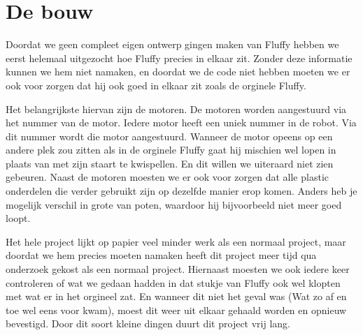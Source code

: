 \chapter{De bouw}
Doordat we geen compleet eigen ontwerp gingen maken van Fluffy hebben we eerst helemaal uitgezocht hoe Fluffy precies in elkaar zit. Zonder deze informatie kunnen we hem niet namaken, en doordat we de code niet hebben moeten we er ook voor zorgen dat hij ook goed in elkaar zit zoals de orginele Fluffy. 

Het belangrijkste hiervan zijn de motoren. De motoren worden aangestuurd via het nummer van de motor. Iedere motor heeft een uniek nummer in de robot. Via dit nummer wordt die motor aangestuurd. Wanneer de motor opeens op een andere plek zou zitten als in de orginele Fluffy gaat hij mischien wel lopen in plaats van met zijn staart te kwispellen. En dit willen we uiteraard niet zien gebeuren. 
Naast de motoren moesten we er ook voor zorgen dat alle plastic onderdelen die verder gebruikt zijn op dezelfde manier erop komen. Anders heb je mogelijk verschil in grote van poten, waardoor hij bijvoorbeeld niet meer goed loopt. 

Het hele project lijkt op papier veel minder werk als een normaal project, maar doordat we hem precies moeten namaken heeft dit project meer tijd qua onderzoek gekost als een normaal project. Hiernaast moesten we ook iedere keer controleren of wat we gedaan hadden in dat stukje van Fluffy ook wel klopten met wat er in het orgineel zat. En wanneer dit niet het geval was (Wat zo af en toe wel eens voor kwam), moest dit weer uit elkaar gehaald worden en opnieuw bevestigd. Door dit soort kleine dingen duurt dit project vrij lang.

